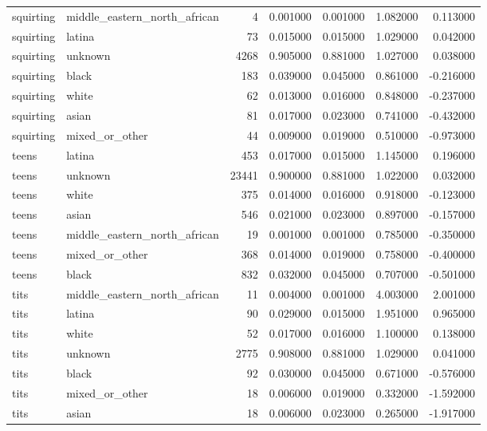 \begin{tabular}{llrrrrr}
squirting & middle_eastern_north_african & 4 & 0.001000 & 0.001000 & 1.082000 & 0.113000 \\
squirting & latina & 73 & 0.015000 & 0.015000 & 1.029000 & 0.042000 \\
squirting & unknown & 4268 & 0.905000 & 0.881000 & 1.027000 & 0.038000 \\
squirting & black & 183 & 0.039000 & 0.045000 & 0.861000 & -0.216000 \\
squirting & white & 62 & 0.013000 & 0.016000 & 0.848000 & -0.237000 \\
squirting & asian & 81 & 0.017000 & 0.023000 & 0.741000 & -0.432000 \\
squirting & mixed_or_other & 44 & 0.009000 & 0.019000 & 0.510000 & -0.973000 \\
teens & latina & 453 & 0.017000 & 0.015000 & 1.145000 & 0.196000 \\
teens & unknown & 23441 & 0.900000 & 0.881000 & 1.022000 & 0.032000 \\
teens & white & 375 & 0.014000 & 0.016000 & 0.918000 & -0.123000 \\
teens & asian & 546 & 0.021000 & 0.023000 & 0.897000 & -0.157000 \\
teens & middle_eastern_north_african & 19 & 0.001000 & 0.001000 & 0.785000 & -0.350000 \\
teens & mixed_or_other & 368 & 0.014000 & 0.019000 & 0.758000 & -0.400000 \\
teens & black & 832 & 0.032000 & 0.045000 & 0.707000 & -0.501000 \\
tits & middle_eastern_north_african & 11 & 0.004000 & 0.001000 & 4.003000 & 2.001000 \\
tits & latina & 90 & 0.029000 & 0.015000 & 1.951000 & 0.965000 \\
tits & white & 52 & 0.017000 & 0.016000 & 1.100000 & 0.138000 \\
tits & unknown & 2775 & 0.908000 & 0.881000 & 1.029000 & 0.041000 \\
tits & black & 92 & 0.030000 & 0.045000 & 0.671000 & -0.576000 \\
tits & mixed_or_other & 18 & 0.006000 & 0.019000 & 0.332000 & -1.592000 \\
tits & asian & 18 & 0.006000 & 0.023000 & 0.265000 & -1.917000 \\
\bottomrule
\end{tabular}
